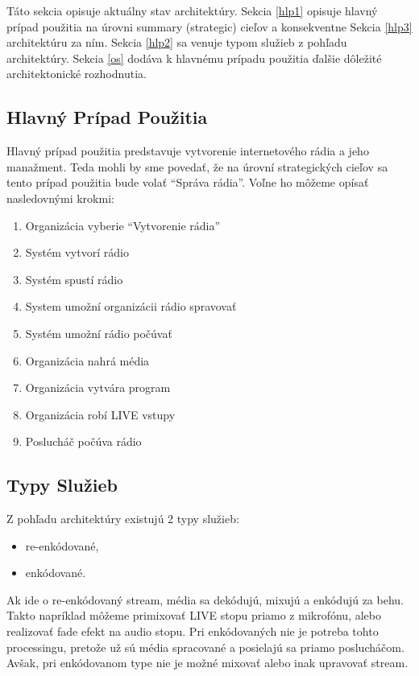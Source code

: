 \documentclass[11pt]{article}
\begin{document}
Táto sekcia opisuje aktuálny stav architektúry. Sekcia \ref{hlp1} opisuje hlavný prípad použitia na úrovni summary (strategic) cieľov a konsekventne Sekcia \ref{hlp3} architektúru za ním. Sekcia \ref{hlp2} sa venuje typom služieb z pohľadu architektúry. Sekcia \ref{os} dodáva k hlavnému prípadu použitia ďalšie dôležité architektonické rozhodnutia.


\subsection{Hlavný Prípad Použitia \label{hlp1}}

Hlavný prípad použitia predstavuje vytvorenie internetového rádia a jeho manažment. Teda mohli by sme povedať, že na úrovní strategických cieľov sa tento prípad použitia bude volať ``Správa rádia''. Voľne ho môžeme opísať nasledovnými krokmi:

\begin{enumerate}[noitemsep]
\item Organizácia vyberie ``Vytvorenie rádia''
\item Systém vytvorí rádio
\item Systém spustí rádio
\item System umožní organizácii rádio spravovať
\item Systém umožní rádio počúvať
\item Organizácia nahrá média
\item Organizácia vytvára program
\item Organizácia robí LIVE vstupy
\item Poslucháč počúva rádio
\end{enumerate}

\subsection{Typy Služieb \label{hlp2}}

Z pohľadu architektúry existujú 2 typy služieb:

\begin{itemize}[noitemsep]
\item re-enkódované,
\item enkódované.
\end{itemize}

Ak ide o re-enkódovaný stream, média sa dekódujú, mixujú a enkódujú za behu. Takto napríklad môžeme primixovať LIVE stopu priamo z mikrofónu, alebo realizovať fade efekt na audio stopu. Pri enkódovaných nie je potreba tohto processingu, pretože už sú média spracované a posielajú sa priamo poslucháčom. Avšak, pri enkódovanom type nie je možné mixovať alebo inak upravovať stream.
\end{document}
